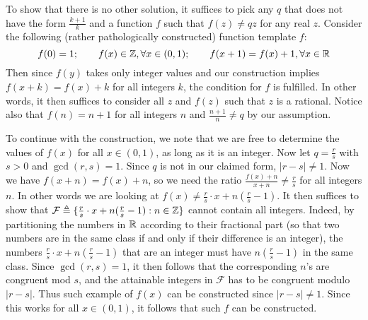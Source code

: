 \documentclass[11pt,a4paper]{article}
\begin{document}
\begin{enumerate}
		To show that there is no other solution, 
		it suffices to pick any $q$ that does not have the form $\frac{k+1}{k}$ 
		and a function $f$ such that $f(z)\neq qz$ for any real $z$. 
		Consider the following (rather pathologically constructed) function template $f$: 
		\[
		f(0) = 1;\qquad  f(x)\in {\mathbb Z}, \forall x\in (0, 1); \qquad 
		f(x + 1) = f(x) + 1, \forall x\in{\mathbb R}
		\]
		Then since $f(y)$ takes only integer values and our construction implies $f(x + k)=f(x) + k$ for all integers $k$, 
		the condition for $f$ is fulfilled. 
		In other words, it then suffices to consider all $z$ and $f(z)$ such that $z$ is a rational. 
		Notice also that $f(n) = n + 1$ for all integers $n$ and $\frac{n+1}{n}\neq q$ by our assumption. 
		
		To continue with the construction, we note that we are free to determine the values of $f(x)$ for all $x\in (0, 1)$, 
		as long as it is an integer. Now let $q=\frac{r}{s}$ with $s > 0$ and $\gcd(r, s)=1$. 
		Since $q$ is not in our claimed form, $|r - s|\neq 1$. 
		Now we have $f(x + n) = f(x) + n$, so we need the ratio $\frac{f(x) + n}{x + n}\neq \frac{r}{s}$ 
		for all integers $n$. 
		In other words we are looking at $f(x)\neq \frac{r}{s}\cdot x + n(\frac{r}{s} - 1)$. 
		It then suffices to show that $\mathcal{F}\triangleq \{\frac{r}{s}\cdot x + n(\frac{r}{s} - 1): n\in{\mathbb Z}\}$ cannot contain all integers. 
		Indeed, by partitioning the numbers in ${\mathbb R}$ according to their fractional part 
		(so that two numbers are in the same class if and only if their difference is an integer), 
		the numbers $\frac{r}{s}\cdot x + n(\frac{r}{s} - 1)$ that are an integer must have 
		$n(\frac{r}{s} - 1)$ in the same class. 
		Since $\gcd(r, s) = 1$, it then follows that the corresponding $n$'s are congruent mod $s$, 
		and the attainable integers in $\mathcal{F}$ has to be congruent modulo $|r - s|$. 
		Thus such example of $f(x)$ can be constructed since $|r-s|\neq 1$. 
		Since this works for all $x\in (0, 1)$, it follows that such $f$ can be constructed. 
		
	\end{enumerate}
    
\end{document}
